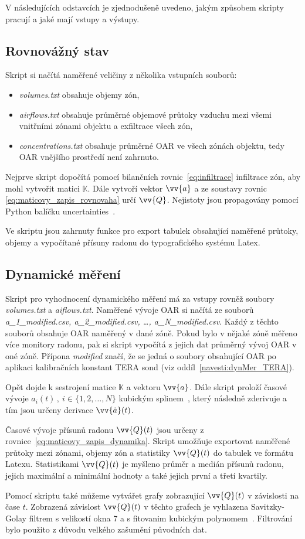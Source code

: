 V následujících odstavcích je zjednodušeně uvedeno, jakým způsobem skripty pracují a jaké mají vstupy a výstupy.
\subsection{Rovnovážný stav}
Skript si načítá naměřené veličiny z několika vstupních souborů:
\begin{itemize}
    \item\emph{volumes.txt} obsahuje objemy zón,
    \item\emph{airflows.txt} obsahuje průměrné objemové průtoky vzduchu mezi všemi  vnitřními zónami objektu a exfiltrace všech zón,
    \item\emph{concentrations.txt} obsahuje průměrné OAR ve všech zónách objektu, tedy OAR vnějšího prostředí není zahrnuto.
\end{itemize}

Nejprve skript dopočítá pomocí bilančních rovnic~\eqref{eq:infiltrace} infiltrace zón, aby mohl vytvořit matici $\mathbb{K}$. Dále vytvoří vektor $\vv{a}$ a ze soustavy rovnic \eqref{eq:maticovy_zapis_rovnovaha} určí $\vv{Q}$. Nejistoty jsou propagovány pomocí Python balíčku uncertainties~\cite{uncertainties}.

Ve skriptu jsou zahrnuty funkce pro export tabulek obsahující naměřené průtoky, objemy a vypočítané přísuny radonu do typografického systému Latex.

\subsection{Dynamické měření}
Skript pro vyhodnocení dynamického měření má za vstupy rovněž soubory \emph{volumes.txt} a \emph{aiflows.txt}. Naměřené vývoje OAR si načítá ze souborů \emph{a\_1\_modified.csv, a\_2\_modified.csv, \ldots, a\_N\_modified.csv}. Každý z těchto souborů obsahuje OAR naměřený v dané zóně. Pokud bylo v nějaké zóně měřeno více monitory radonu, pak si skript vypočítá z jejich dat průměrný vývoj OAR v oné zóně. Přípona \emph{modified} značí, že se jedná o soubory obsahující OAR po aplikaci kalibračních konstant TERA sond (viz oddíl~\ref{navesti:dynMer_TERA}).

Opět dojde k sestrojení matice $\mathbb{K}$ a vektoru $\vv{a}$. Dále skript proloží časové vývoje $a_i(t)\,,\ i\in\{1,2,\dots,N\}$ kubickým splinem~\cite{spline}, který následně zderivuje a tím jsou určeny derivace $\vv{\dot{a}}(t)$.

Časové vývoje přísunů radonu $\vv{Q}(t)$ jsou určeny z rovnice~\eqref{eq:maticovy_zapis_dynamika}. Skript umožňuje exportovat naměřené průtoky mezi zónami, objemy zón a statistiky $\vv{Q}(t)$ do tabulek ve formátu Latexu. Statistikami $\vv{Q}(t)$ je myšleno průměr a medián přísunů radonu, jejich maximální a minimální hodnoty a také jejich první a třetí kvartily. 

Pomocí skriptu také můžeme vytvářet grafy zobrazující $\vv{Q}(t)$ v závislosti na čase $t$. Zobrazená závislost  $\vv{Q}(t)$ v těchto grafech je vyhlazena Savitzky-Golay filtrem s velikostí okna 7 a s fitovanim kubickým polynomem~\cite{savgol}. Filtrování bylo použito z důvodu velkého zašumění původních dat. 
